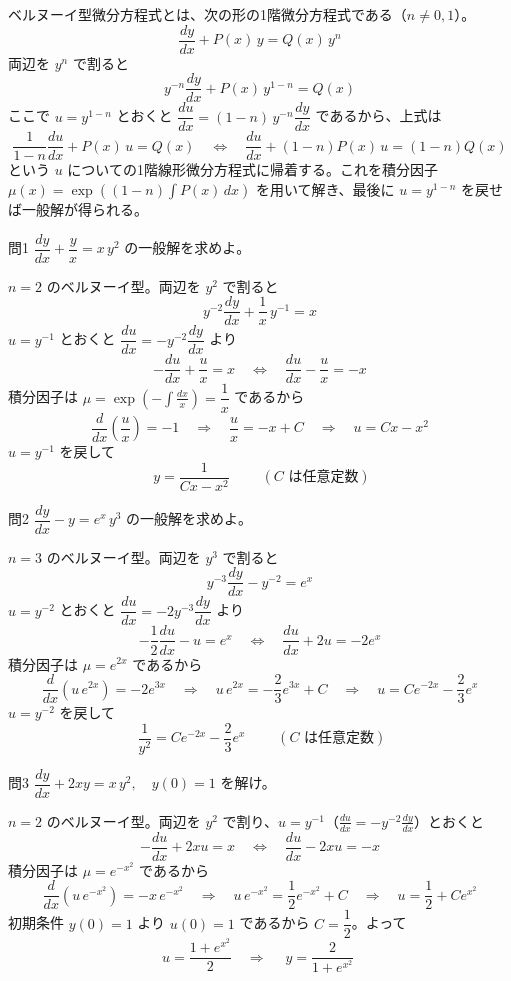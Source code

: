 \documentclass[a4paper,11pt]{article}
\begin{document}


\noindent
ベルヌーイ型微分方程式とは、次の形の1階微分方程式である（$n \neq 0, 1$）。
\[
\frac{dy}{dx} + P(x)\,y = Q(x)\,y^{n}
\]
両辺を $y^{n}$ で割ると
\[
y^{-n}\frac{dy}{dx} + P(x)\,y^{1-n} = Q(x)
\]
ここで $u = y^{1-n}$ とおくと $\dfrac{du}{dx} = (1-n)\,y^{-n}\dfrac{dy}{dx}$ であるから、上式は
\[
\frac{1}{1-n}\frac{du}{dx} + P(x)\,u = Q(x)
\quad\Longleftrightarrow\quad
\frac{du}{dx} + (1-n)P(x)\,u = (1-n)Q(x)
\]
という $u$ についての1階線形微分方程式に帰着する。これを積分因子 $\mu(x) = \exp\left((1-n)\displaystyle\int P(x)\,dx\right)$ を用いて解き、最後に $u = y^{1-n}$ を戻せば一般解が得られる。

\clearpage
\begin{mondaiboxS}{問1}
$\dfrac{dy}{dx} + \dfrac{y}{x} = x\,y^{2}$ の一般解を求めよ。
\end{mondaiboxS}
\kaitou
$n = 2$ のベルヌーイ型。両辺を $y^{2}$ で割ると
\[
y^{-2}\frac{dy}{dx} + \frac{1}{x}\,y^{-1} = x
\]
$u = y^{-1}$ とおくと $\dfrac{du}{dx} = -y^{-2}\dfrac{dy}{dx}$ より
\[
-\frac{du}{dx} + \frac{u}{x} = x
\quad\Longleftrightarrow\quad
\frac{du}{dx} - \frac{u}{x} = -x
\]
積分因子は $\mu = \exp\left(-\displaystyle\int \frac{dx}{x}\right) = \dfrac{1}{x}$ であるから
\[
\frac{d}{dx}\left(\frac{u}{x}\right) = -1
\quad\Longrightarrow\quad
\frac{u}{x} = -x + C
\quad\Longrightarrow\quad
u = Cx - x^{2}
\]
$u = y^{-1}$ を戻して
\[
\boxed{\; y = \frac{1}{Cx - x^{2}} \;}
\qquad (C \text{ は任意定数})
\]

\clearpage
\begin{mondaiboxS}{問2}
$\dfrac{dy}{dx} - y = e^{x}\,y^{3}$ の一般解を求めよ。
\end{mondaiboxS}
\kaitou
$n = 3$ のベルヌーイ型。両辺を $y^{3}$ で割ると
\[
y^{-3}\frac{dy}{dx} - y^{-2} = e^{x}
\]
$u = y^{-2}$ とおくと $\dfrac{du}{dx} = -2y^{-3}\dfrac{dy}{dx}$ より
\[
-\frac{1}{2}\frac{du}{dx} - u = e^{x}
\quad\Longleftrightarrow\quad
\frac{du}{dx} + 2u = -2e^{x}
\]
積分因子は $\mu = e^{2x}$ であるから
\[
\frac{d}{dx}\left(u\,e^{2x}\right) = -2e^{3x}
\quad\Longrightarrow\quad
u\,e^{2x} = -\frac{2}{3}e^{3x} + C
\quad\Longrightarrow\quad
u = Ce^{-2x} - \frac{2}{3}e^{x}
\]
$u = y^{-2}$ を戻して
\[
\boxed{\; \frac{1}{y^{2}} = Ce^{-2x} - \frac{2}{3}e^{x} \;}
\qquad (C \text{ は任意定数})
\]

\clearpage
\begin{mondaiboxS}{問3}
$\dfrac{dy}{dx} + 2xy = x\,y^{2}, \quad y(0) = 1$ を解け。
\end{mondaiboxS}
\kaitou
$n = 2$ のベルヌーイ型。両辺を $y^{2}$ で割り、$u = y^{-1}$（$\frac{du}{dx} = -y^{-2}\frac{dy}{dx}$）とおくと
\[
-\frac{du}{dx} + 2xu = x
\quad\Longleftrightarrow\quad
\frac{du}{dx} - 2xu = -x
\]
積分因子は $\mu = e^{-x^{2}}$ であるから
\[
\frac{d}{dx}\left(u\,e^{-x^{2}}\right) = -x\,e^{-x^{2}}
\quad\Longrightarrow\quad
u\,e^{-x^{2}} = \frac{1}{2}e^{-x^{2}} + C
\quad\Longrightarrow\quad
u = \frac{1}{2} + Ce^{x^{2}}
\]
初期条件 $y(0) = 1$ より $u(0) = 1$ であるから $C = \dfrac{1}{2}$。よって
\[
u = \frac{1 + e^{x^{2}}}{2}
\quad\Longrightarrow\quad
\boxed{\; y = \frac{2}{1 + e^{x^{2}}} \;}
\]
\end{document}
